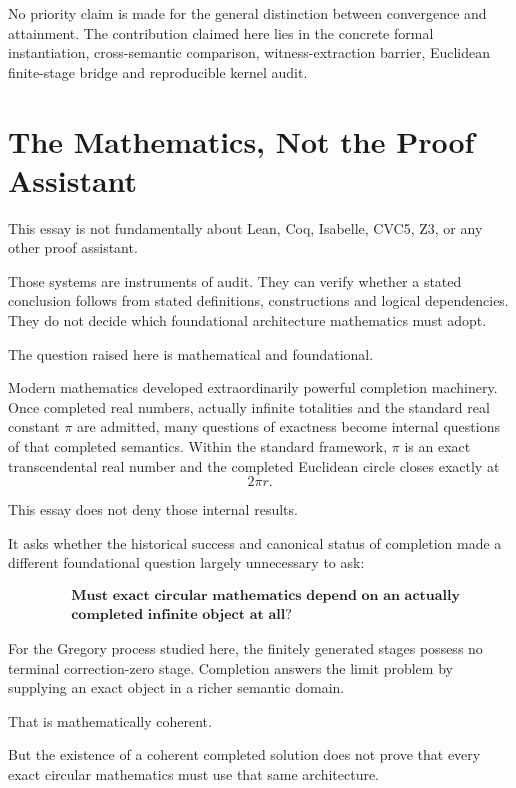 \documentclass[11pt,a4paper]{article}
\begin{document}
No priority claim is made for the general distinction between
convergence and attainment. The contribution claimed here lies in the
concrete formal instantiation, cross-semantic comparison,
witness-extraction barrier, Euclidean finite-stage bridge and
reproducible kernel audit.


\section{The Mathematics, Not the Proof Assistant}
\label{sec:mathematics-not-assistant}

This essay is not fundamentally about Lean, Coq, Isabelle, CVC5,
Z3, or any other proof assistant.

Those systems are instruments of audit. They can verify whether a
stated conclusion follows from stated definitions, constructions and
logical dependencies. They do not decide which foundational
architecture mathematics must adopt.

The question raised here is mathematical and foundational.

Modern mathematics developed extraordinarily powerful completion
machinery. Once completed real numbers, actually infinite totalities
and the standard real constant \(\pi\) are admitted, many questions of
exactness become internal questions of that completed semantics.
Within the standard framework, \(\pi\) is an exact transcendental real
number and the completed Euclidean circle closes exactly at
\[
2\pi r.
\]

This essay does not deny those internal results.

It asks whether the historical success and canonical status of
completion made a different foundational question largely unnecessary
to ask:

\[
\boxed{
\begin{aligned}
&\textbf{Must exact circular mathematics depend on an actually}\\
&\textbf{completed infinite object at all?}
\end{aligned}
}
\]

For the Gregory process studied here, the finitely generated stages
possess no terminal correction-zero stage. Completion answers the
limit problem by supplying an exact object in a richer semantic domain.

That is mathematically coherent.

But the existence of a coherent completed solution does not prove that
every exact circular mathematics must use that same architecture.
\end{document}

